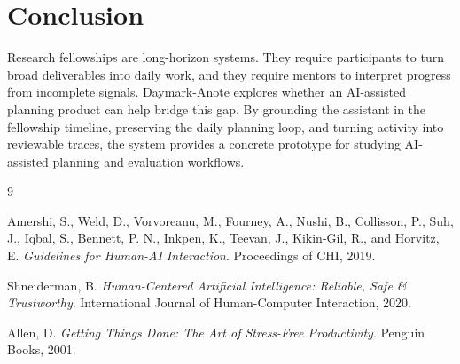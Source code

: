 \documentclass[11pt]{article}
\begin{document}
\section{Conclusion}

Research fellowships are long-horizon systems. They require participants to turn broad deliverables into daily work, and they require mentors to interpret progress from incomplete signals. Daymark-Anote explores whether an AI-assisted planning product can help bridge this gap. By grounding the assistant in the fellowship timeline, preserving the daily planning loop, and turning activity into reviewable traces, the system provides a concrete prototype for studying AI-assisted planning and evaluation workflows.

\begin{thebibliography}{9}

Amershi, S., Weld, D., Vorvoreanu, M., Fourney, A., Nushi, B., Collisson, P., Suh, J., Iqbal, S., Bennett, P. N., Inkpen, K., Teevan, J., Kikin-Gil, R., and Horvitz, E.
\textit{Guidelines for Human-AI Interaction}.
Proceedings of CHI, 2019.

Shneiderman, B.
\textit{Human-Centered Artificial Intelligence: Reliable, Safe \& Trustworthy}.
International Journal of Human-Computer Interaction, 2020.

Allen, D.
\textit{Getting Things Done: The Art of Stress-Free Productivity}.
Penguin Books, 2001.

\end{thebibliography}
\end{document}
